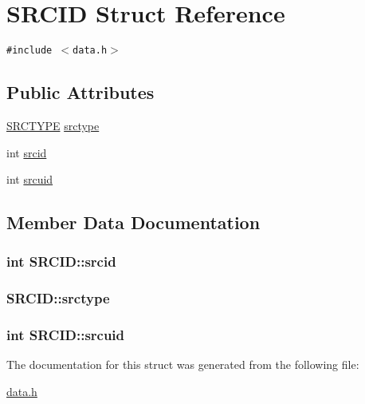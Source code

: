 \hypertarget{struct_s_r_c_i_d}{
\section{SRCID Struct Reference}
\label{struct_s_r_c_i_d}
}
{\tt \#include $<$data.h$>$}

\subsection*{Public Attributes}
\begin{CompactItemize}
\item 
\hyperlink{data_8h_5f7cbbdfa741baae674e395b0378f6a2}{SRCTYPE} \hyperlink{struct_s_r_c_i_d_d5e6b5f1d50e1febe9992e31cf06c0bb}{srctype}
\item 
int \hyperlink{struct_s_r_c_i_d_003e1afc3e4e5e771aa0c631ac71a093}{srcid}
\item 
int \hyperlink{struct_s_r_c_i_d_ca6b220a9fe125f390e1d8b39628587f}{srcuid}
\end{CompactItemize}


\subsection{Member Data Documentation}
\hypertarget{struct_s_r_c_i_d_003e1afc3e4e5e771aa0c631ac71a093}{
\subsubsection[{srcid}]{\setlength{\rightskip}{0pt plus 5cm}int {\bf SRCID::srcid}}}
\label{struct_s_r_c_i_d_003e1afc3e4e5e771aa0c631ac71a093}


\hypertarget{struct_s_r_c_i_d_d5e6b5f1d50e1febe9992e31cf06c0bb}{
\subsubsection[{srctype}]{ {\bf SRCID::srctype}}}
\label{struct_s_r_c_i_d_d5e6b5f1d50e1febe9992e31cf06c0bb}


\hypertarget{struct_s_r_c_i_d_ca6b220a9fe125f390e1d8b39628587f}{
\subsubsection[{srcuid}]{\setlength{\rightskip}{0pt plus 5cm}int {\bf SRCID::srcuid}}}
\label{struct_s_r_c_i_d_ca6b220a9fe125f390e1d8b39628587f}




The documentation for this struct was generated from the following file:\begin{CompactItemize}
\item 
\hyperlink{data_8h}{data.h}\end{CompactItemize}
